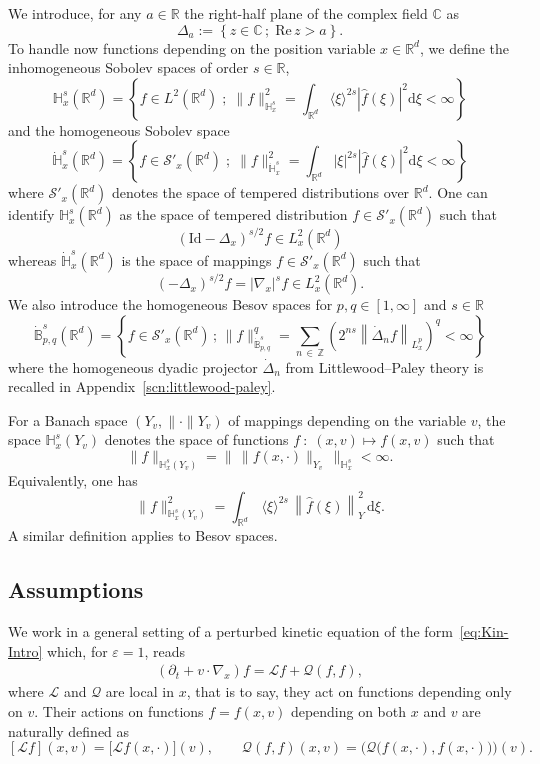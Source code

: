 \documentclass[10pt]{amsart}
\theoremstyle{definition}\newtheorem{defi}[theo]{Definition}\newtheorem{rema}[theo]{Remark}\newtheorem{exam}[theo]{Example}\newtheorem{exem}[theo]{Example}\newtheorem{nota}[theo]{Notation}
\newcommand{\Id}{\mathrm{Id}}
\renewcommand{\d}{\mathrm{d}}
\newcommand{\re}{\mathrm{Re}\,}
\newcommand{\R}{\mathbb{R}}
\newcommand{\C}{\mathbb{C}}
\newcommand{\Z}{\mathbb{Z}}
\newcommand{\bbH}{\mathbb{H}}
\newcommand{\bbB}{\mathbb{B}}
\newcommand{\LL}{\mathcal{L}}
\newcommand{\QQ}{\mathcal{Q}}
\newcommand{\scS}{\mathscr{S}}
\newcommand*\eps{{\varepsilon}}
\begin{document}
We introduce, for any $a \in \R$ the right-half plane of the complex field $\C$ as
\[
\Delta_{a}:=\left\{z \in \C\,;\;\re z >a\right\}.
\]
To handle now functions depending on the position variable $x\in \R^d$, we define the {inhomogeneous} Sobolev spaces of order $s \in \R$,
\[
\bbH^{s}_{x}(\R^{d})=\left\{f \in L^{2}(\R^{d})\;;\;\|f\|_{\bbH_{x}^{s}}^{2}=\int_{\R^{d}}\langle \xi\rangle^{2s}\left|\widehat{f}(\xi)\right|^{2}\d\xi <\infty\right\}
\]
and the homogeneous Sobolev space
\[
\dot{\bbH}^{s}_{x}(\R^{d})=\left\{f \in \scS'_x(\R^{d})\;;\;\|f\|_{\dot{\bbH}_{x}^{s}}^{2}=\int_{\R^{d}}|\xi|^{2s}\left|\widehat{f}(\xi)\right|^{2}\d\xi <\infty\right\}
\]
where $\scS'_x(\R^d)$ denotes the space of tempered distributions over $\R^d$. One can identify $\bbH^{s}_{x}(\R^{d})$ as the space of tempered distribution $f \in \scS'_{x}(\R^{d})$ such that
\[
\left(\Id-\Delta_{x}\right)^{s/2}f \in L^{2}_{x}(\R^{d})
\]
whereas $\dot{\bbH}_{x}^{s}(\R^{d})$ is the space of mappings $f \in \scS'_{x}(\R^{d})$ such that
\[
(-\Delta_{x})^{s/2}f = |\nabla_x |^s f \in L^{2}_{x}(\R^{d}).
\]
We also introduce the homogeneous Besov spaces for $p, q \in [1, \infty]$ and $s \in \R$
\[
\dot{\bbB}^s_{p, q}\left(\R^d \right) = \left\{ f \in \scS'_x \left(\R^d\right) \, ; \, \| f \|_{ \dot{\bbB}^s_{p, q} }^q = \sum_{n\,\in\,\Z} \left(2^{ n s } \left\| \dot{\Delta}_{n} f \right\|_{ L^p_x } \right)^q < \infty\right \}
\]
where the homogeneous dyadic projector $\dot{\Delta}_n$ from Littlewood--Paley theory is recalled in Appendix~\ref{scn:littlewood-paley}.


For a Banach space $(Y_{v},\|\cdot\|{Y_{v}})$ of mappings depending on the variable $v$, the space $\bbH^{s}_{x}\left(Y_{v}\right)$
denotes the space of functions $f\::\;(x,v) \mapsto f(x,v)$ such that
\[
\|f\|_{\bbH^{s}_{x}\left(Y_{v}\right)}=\big\|\,\|f(x,\cdot)\|_{Y_{v}}\,\big\|_{\bbH^{s}_{x}} < \infty.
\]
Equivalently, one has
\begin{equation}\label{eq:normHsx}
\|f\|_{\bbH^s_x\left(Y_v\right)}^2=\int_{\R^d}\,\langle\xi\rangle^{2s}\,\left\|\widehat{f}(\xi)\right\|_{Y}^2\,\d\xi.
\end{equation}
A similar definition applies to Besov spaces.

\subsection{Assumptions} 
We work in a general setting of a perturbed kinetic equation of the form~\eqref{eq:Kin-Intro} which, for $\eps=1$, reads
\begin{gather*}
(\partial_t + v \cdot \nabla_x)f = \LL f + \QQ(f, f),
\end{gather*}
where $\LL$ and $\QQ$ are local in $x$, that is to say, they act on functions depending only on $v$. Their actions on functions $f=f(x, v)$ depending on both $x$ and $v$ are naturally defined as
\[
[\LL f](x, v) = \big[\LL f(x, \cdot) \big](v), \qquad \QQ(f, f)(x, v) = \Big(\QQ\big(f(x, \cdot), f(x, \cdot) \big) \Big)(v).
\]
\end{document}
